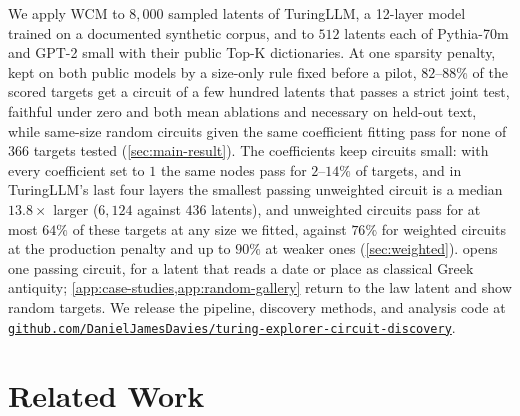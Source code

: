\documentclass[10pt]{article}
\newif\ifexternal
\DeclareRobustCommand{\pending}[1]{%
  \ifexternal
    \ifvmode\textcolor{black!55}{[to be added]}\else\unskip\fi
  \else
    \textcolor{red!70!black}{[\textit{pending: #1}]}%
  \fi}
\begin{document}
We apply WCM to $8{,}000$ sampled latents of TuringLLM, a 12-layer model trained on a documented synthetic corpus, and to $512$ latents each of Pythia-70m and GPT-2 small with their public Top-K dictionaries.
At one sparsity penalty, kept on both public models by a size-only rule fixed before a pilot, $82$--$88\%$ of the scored targets get a circuit of a few hundred latents that passes a strict joint test, faithful under zero and both mean ablations and necessary on held-out text, while same-size random circuits given the same coefficient fitting pass for none of $366$ targets tested (\cref{sec:main-result}).
The coefficients keep circuits small: with every coefficient set to $1$ the same nodes pass for $2$--$14\%$ of targets, and in TuringLLM's last four layers the smallest passing unweighted circuit is a median $13.8\times$ larger ($6{,}124$ against $436$ latents), and unweighted circuits pass for at most $64\%$ of these targets at any size we fitted, against $76\%$ for weighted circuits at the production penalty and up to $90\%$ at weaker ones (\cref{sec:weighted}).
 opens one passing circuit, for a latent that reads a date or place as classical Greek antiquity; \cref{app:case-studies,app:random-gallery} return to the law latent and show random targets.
We release the pipeline, discovery methods, and analysis code at \href{https://github.com/DanielJamesDavies/turing-explorer-circuit-discovery}{\nolinkurl{github.com/DanielJamesDavies/turing-explorer-circuit-discovery}}.

\section{Related Work}
\end{document}

